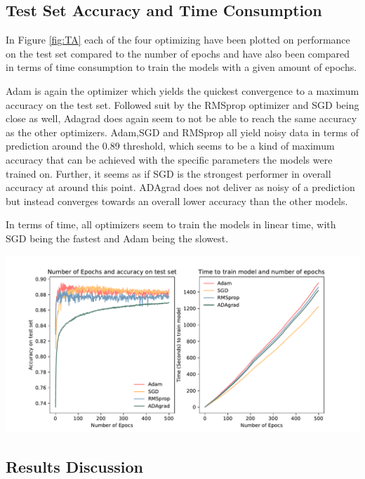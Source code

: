\documentclass[oneside]{article}
\begin{document}
\subsection{Test Set Accuracy and Time Consumption}
In  Figure \ref{fig:TA} each of the four optimizing have been plotted on performance on the test set compared to the number of epochs and have also been compared in terms of time consumption to train the models with a given amount of epochs. \par
Adam is again the optimizer which yields the quickest convergence to a maximum accuracy on the test set. Followed suit by the RMSprop optimizer and SGD being close as well, Adagrad does again seem to not be able to reach the same accuracy as the other optimizers. Adam,SGD and RMSprop all yield noisy data in terms of prediction around the 0.89 threshold, which seems to be a kind of maximum accuracy that can be achieved with the specific parameters the models were trained on. Further, it seems as if SGD is the strongest performer in overall accuracy at around this point. ADAgrad does not deliver as noisy of a prediction but instead converges towards an overall lower accuracy than the other models. \par

In terms of time, all optimizers seem to train the models in linear time, with SGD being the fastest and Adam being the slowest.

\begin{center}
    \includegraphics[width=1\textwidth]{report/figures/time_and_accuracy.pdf}
    \label{fig:TA}\\
\end{center}




\subsection{Results Discussion}
\end{document}
